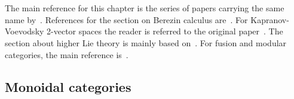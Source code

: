 \chapter{}\label{chapter:hda}

    The main reference for this chapter is the series of papers carrying the same name by~\citet{baez_higher-dimensional_2003, baez_higher-dimensional_2003-1}. References for the section on Berezin calculus are~\citet{losev_berezin_2007, choquet-bruhat_analysis_2000}. For Kapranov-Voevodsky 2-vector spaces the reader is referred to the original paper~\citet{kapranov_2-categories_1994}. The section about higher Lie theory is mainly based on~\citet{fiorenza_introduction_2004}. For fusion and modular categories, the main reference is~\citet{etingof_tensor_2016}.

\section{Monoidal categories}\label{section:monoidal_categories}

